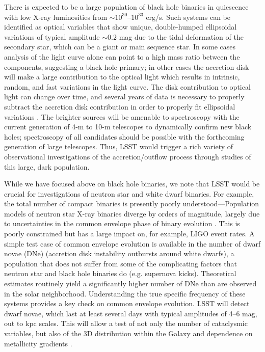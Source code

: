 There is expected to be a large population of black hole binaries in quiescence
with low X-ray luminosities from $\sim 10^{30}$--$10^{33}$ erg/s.
Such systems can be identified as optical variables that show unique,
double-humped ellipsoidal variations of typical amplitude $\sim 0.2$
mag due to the tidal deformation of the secondary star, which can be a
giant or main sequence star. In some cases analysis of the light curve
alone can point to a high mass ratio between the components,
suggesting a black hole primary; in other cases the accretion disk
will make a large contribution to the optical light which results in
intrinsic, random, and fast variations in the light curve. The disk
contribution to optical light can change over time, and several years
of data is necessary to properly subtract the accretion disk
contribution in order to properly fit ellipsoidal variations
\citep{2010ApJ...710.1127C}.
The brighter sources will be amenable to spectroscopy
with the current generation of 4-m to 10-m telescopes to dynamically
confirm new black holes; spectroscopy of all candidates should be
possible with the forthcoming generation of large telescopes. Thus,
LSST would trigger a rich variety of observational investigations of
the accretion/outflow process through studies of this large, dark
population.

While we have focused above on black hole binaries, we note that LSST would be
crucial for investigations of neutron star and white dwarf binaries. For
example, the total number of compact binaries is presently poorly
understood---Population models of neutron star X-ray binaries diverge by orders
of magnitude, largely due to uncertainties in the common envelope phase of
binary evolution
\citep[e.g.,][]{2003ApJ...597.1036P,2006MNRAS.369.1152K,2015A&A...579A..33V}.
This is poorly constrained but has a large impact on, for example,
LIGO event rates. A simple test case of common envelope evolution is available
in the number of dwarf novae (DNe) (accretion disk instability outbursts around
white dwarfs), a population that does not suffer from some of the complicating
factors that neutron star and black hole binaries do (e.g. supernova kicks).
Theoretical estimates routinely yield a significantly higher number of DNe than
are observed in the solar neighborhood. Understanding the true specific
frequency of these systems provides a key check on common envelope evolution.
LSST will detect dwarf novae, which last at least several days with typical
amplitudes of 4--6 mag, out to kpc scales. This will allow a test of not only
the number of cataclysmic variables, but also of the 3D distribution within the
Galaxy and dependence on metallicity gradients \citep{2015MNRAS.448.3455B}.


